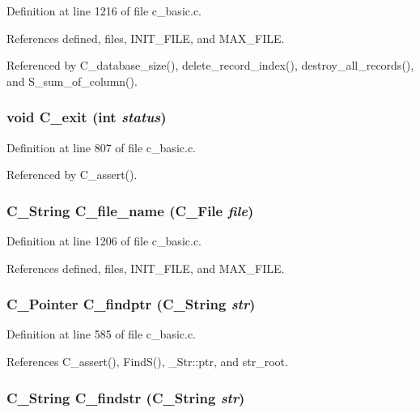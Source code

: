 Definition at line 1216 of file c\_\-basic.c.

References defined, files, INIT\_\-FILE, and MAX\_\-FILE.

Referenced by C\_\-database\_\-size(), delete\_\-record\_\-index(), destroy\_\-all\_\-records(), and S\_\-sum\_\-of\_\-column().
\subsubsection{\setlength{\rightskip}{0pt plus 5cm}void C\_\-exit (int {\em status})}\label{c__basic_8h_32cdf224b079aa8b1797810edbec450f}




Definition at line 807 of file c\_\-basic.c.

Referenced by C\_\-assert().
\subsubsection{\setlength{\rightskip}{0pt plus 5cm}\bf{C\_\-String} C\_\-file\_\-name (\bf{C\_\-File} {\em file})}\label{c__basic_8h_db58c65b7e74e25e976ba6e120ed4fff}




Definition at line 1206 of file c\_\-basic.c.

References defined, files, INIT\_\-FILE, and MAX\_\-FILE.
\subsubsection{\setlength{\rightskip}{0pt plus 5cm}\bf{C\_\-Pointer} C\_\-findptr (\bf{C\_\-String} {\em str})}\label{c__basic_8h_e0b71de272307872c136d57ec2b265b4}




Definition at line 585 of file c\_\-basic.c.

References C\_\-assert(), Find\-S(), \_\-Str::ptr, and str\_\-root.
\subsubsection{\setlength{\rightskip}{0pt plus 5cm}\bf{C\_\-String} C\_\-findstr (\bf{C\_\-String} {\em str})}\label{c__basic_8h_160629f63c002bc5a860040ef7ca5dd0}





